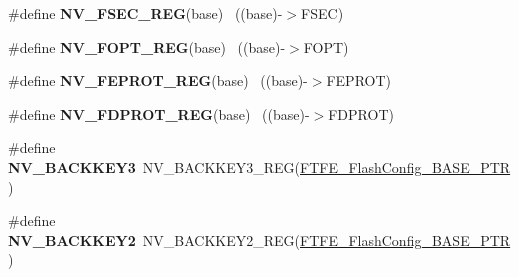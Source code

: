 \begin{DoxyCompactItemize}
\item 
\hypertarget{group___n_v___register___accessor___macros_gafcfd540f11abf7f4644b7c5a5bc272fe}{}\#define {\bfseries N\+V\+\_\+\+F\+S\+E\+C\+\_\+\+R\+E\+G}(base)                                            ~((base)-\/$>$F\+S\+E\+C)\label{group___n_v___register___accessor___macros_gafcfd540f11abf7f4644b7c5a5bc272fe}

\item 
\hypertarget{group___n_v___register___accessor___macros_ga66cb061090c7bd7c8b2447b133a93ce5}{}\#define {\bfseries N\+V\+\_\+\+F\+O\+P\+T\+\_\+\+R\+E\+G}(base)                                            ~((base)-\/$>$F\+O\+P\+T)\label{group___n_v___register___accessor___macros_ga66cb061090c7bd7c8b2447b133a93ce5}

\item 
\hypertarget{group___n_v___register___accessor___macros_ga689f6db632fecfda17b3a0af63529b29}{}\#define {\bfseries N\+V\+\_\+\+F\+E\+P\+R\+O\+T\+\_\+\+R\+E\+G}(base)                                        ~((base)-\/$>$F\+E\+P\+R\+O\+T)\label{group___n_v___register___accessor___macros_ga689f6db632fecfda17b3a0af63529b29}

\item 
\hypertarget{group___n_v___register___accessor___macros_ga8c387944c38c4df1397982458df8a2f1}{}\#define {\bfseries N\+V\+\_\+\+F\+D\+P\+R\+O\+T\+\_\+\+R\+E\+G}(base)                                        ~((base)-\/$>$F\+D\+P\+R\+O\+T)\label{group___n_v___register___accessor___macros_ga8c387944c38c4df1397982458df8a2f1}

\item 
\hypertarget{group___n_v___register___accessor___macros_ga18932af5b184d02998db112b364e45e1}{}\#define {\bfseries N\+V\+\_\+\+B\+A\+C\+K\+K\+E\+Y3}~N\+V\+\_\+\+B\+A\+C\+K\+K\+E\+Y3\+\_\+\+R\+E\+G(\hyperlink{group___n_v___peripheral_ga824c84d1d5dcc180128d85f4f676b4c5}{F\+T\+F\+E\+\_\+\+Flash\+Config\+\_\+\+B\+A\+S\+E\+\_\+\+P\+T\+R})\label{group___n_v___register___accessor___macros_ga18932af5b184d02998db112b364e45e1}

\item 
\hypertarget{group___n_v___register___accessor___macros_ga51642a3d84acba43ff0aa3925226ab32}{}\#define {\bfseries N\+V\+\_\+\+B\+A\+C\+K\+K\+E\+Y2}~N\+V\+\_\+\+B\+A\+C\+K\+K\+E\+Y2\+\_\+\+R\+E\+G(\hyperlink{group___n_v___peripheral_ga824c84d1d5dcc180128d85f4f676b4c5}{F\+T\+F\+E\+\_\+\+Flash\+Config\+\_\+\+B\+A\+S\+E\+\_\+\+P\+T\+R})\label{group___n_v___register___accessor___macros_ga51642a3d84acba43ff0aa3925226ab32}


\end{DoxyCompactItemize}
